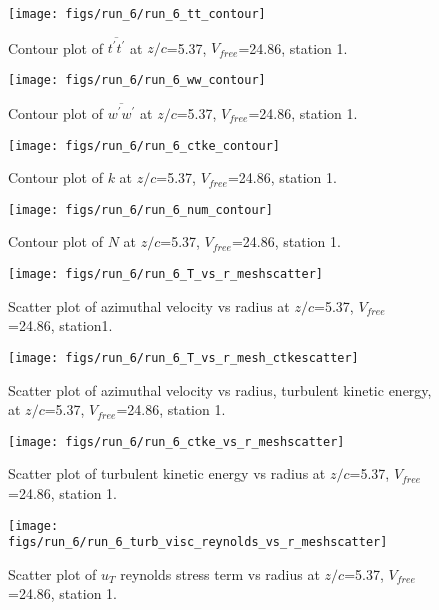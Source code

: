 \begin{figure}[H]
\centering
\texttt{[image: figs/run\_6/run\_6\_tt\_contour]}
\caption{Contour plot of $\overline{t^\prime t^\prime}$ at $z/c$=5.37, $V_{free}$=24.86, station 1.}
\end{figure}


\begin{figure}[H]
\centering
\texttt{[image: figs/run\_6/run\_6\_ww\_contour]}
\caption{Contour plot of $\overline{w^\prime w^\prime}$ at $z/c$=5.37, $V_{free}$=24.86, station 1.}
\end{figure}


\begin{figure}[H]
\centering
\texttt{[image: figs/run\_6/run\_6\_ctke\_contour]}
\caption{Contour plot of $k$ at $z/c$=5.37, $V_{free}$=24.86, station 1.}
\end{figure}


\begin{figure}[H]
\centering
\texttt{[image: figs/run\_6/run\_6\_num\_contour]}
\caption{Contour plot of $N$ at $z/c$=5.37, $V_{free}$=24.86, station 1.}
\end{figure}


\begin{figure}[H]
\centering
\texttt{[image: figs/run\_6/run\_6\_T\_vs\_r\_meshscatter]}
\caption{Scatter plot of azimuthal velocity vs radius at $z/c$=5.37, $V_{free}$=24.86, station1.}
\end{figure}


\begin{figure}[H]
\centering
\texttt{[image: figs/run\_6/run\_6\_T\_vs\_r\_mesh\_ctkescatter]}
\caption{Scatter plot of azimuthal velocity vs radius, turbulent kinetic energy, at $z/c$=5.37, $V_{free}$=24.86, station 1.}
\end{figure}


\begin{figure}[H]
\centering
\texttt{[image: figs/run\_6/run\_6\_ctke\_vs\_r\_meshscatter]}
\caption{Scatter plot of turbulent kinetic energy vs radius at $z/c$=5.37, $V_{free}$=24.86, station 1.}
\end{figure}


\begin{figure}[H]
\centering
\texttt{[image: figs/run\_6/run\_6\_turb\_visc\_reynolds\_vs\_r\_meshscatter]}
\caption{Scatter plot of $
u_T$ reynolds stress term vs radius at $z/c$=5.37, $V_{free}$=24.86, station 1.}
\end{figure}


